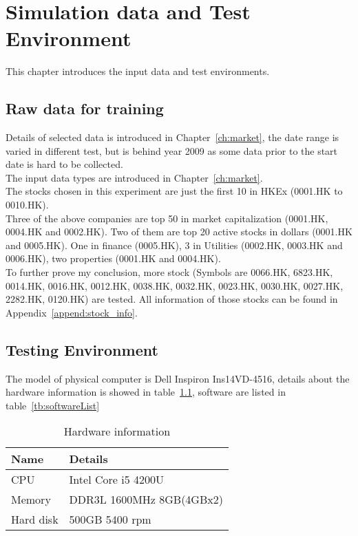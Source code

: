 \chapter{Simulation data and Test Environment}
\label{ch:dataAndEnv}

This chapter introduces the input data and test environments.

\section{Raw data for training}
Details of selected data is introduced in Chapter~\ref{ch:market}, the date range is varied in different test, but is behind year 2009 as some data prior to the start date is hard to be collected. \\

The input data types are introduced in Chapter~\ref{ch:market}.\\

The stocks chosen in this experiment are just the first 10 in HKEx (0001.HK to 0010.HK). \\

Three of the above companies are top 50 in market capitalization (0001.HK, 0004.HK and 0002.HK). Two of them are top 20 active stocks in dollars (0001.HK and 0005.HK). One in finance (0005.HK), 3 in Utilities (0002.HK, 0003.HK and 0006.HK), two properties (0001.HK and 0004.HK).\\

To further prove my conclusion, more stock (Symbols are 0066.HK, 6823.HK, 0014.HK, 0016.HK, 0012.HK, 0038.HK, 0032.HK, 0023.HK, 0030.HK, 0027.HK, 2282.HK, 0120.HK) are tested. All information of those stocks can be found in Appendix~\ref{append:stock_info}.\\


\section{Testing Environment}
\label{sec:environment}
The model of physical computer is Dell Inspiron Ins14VD-4516, details about the hardware information is showed in table~\ref{tb:hardwareConf}, software are listed in table~\ref{tb:softwareList}
\begin{table}[h]
	\centering
	\begin{tabular}{|l|l|}
		\hline
		\textbf{Name} & \textbf{Details} \\ \hline
		CPU & Intel Core i5 4200U \\ \hline
		Memory & DDR3L 1600MHz 8GB(4GBx2) \\ \hline
		Hard disk & 500GB 5400 rpm \\ \hline
	\end{tabular}
	\caption{Hardware information}
	\label{tb:hardwareConf}
\end{table}

